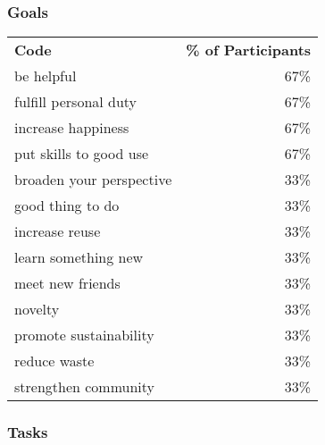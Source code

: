 \subsubsection*{Goals}

\begin{longtable}{p{}r}
\textbf{Code}                & \textbf{\% of Participants} \\
be helpful                   & 67\%                        \\
fulfill personal duty        & 67\%                        \\
increase happiness           & 67\%                        \\
put skills to good use       & 67\%                        \\
broaden your perspective     & 33\%                        \\
good thing to do             & 33\%                        \\
increase reuse               & 33\%                        \\
learn something new          & 33\%                        \\
meet new friends             & 33\%                        \\
novelty                      & 33\%                        \\
promote sustainability       & 33\%                        \\
reduce waste                 & 33\%                        \\
strengthen community         & 33\%                        \\
\end{longtable}

\subsubsection*{Tasks}

